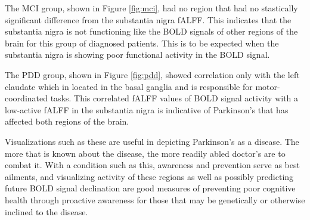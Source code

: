 \documentclass[12pt]{article}
\begin{document}
The MCI group, shown in Figure \ref{fig:mci}, had no region that had no stastically significant difference from the substantia nigra fALFF. This indicates that the substantia nigra is not functioning like the BOLD signals of other regions of the brain for this group of diagnosed patients. This is to be expected when the substantia nigra is showing poor functional activity in the BOLD signal. 

The PDD group, shown in Figure \ref{fig:pdd}, showed correlation only with the left claudate which in located in the basal ganglia and is responsible for motor-coordinated tasks. This correlated fALFF values of BOLD signal activity with a low-active fALFF in the substantia nigra is indicative of Parkinson's that has affected both regions of the brain. 

Visualizations such as these are useful in depicting Parkinson's as a disease. The more that is known about the disease, the more readily abled doctor's are to combat it. With a condition such as this, awareness and prevention serve as best ailments, and visualizing activity of these regions as well as possibly predicting future BOLD signal declination are good measures of preventing poor cognitive health through proactive awareness for those that may be genetically or otherwise inclined to the disease. 


\end{document}

